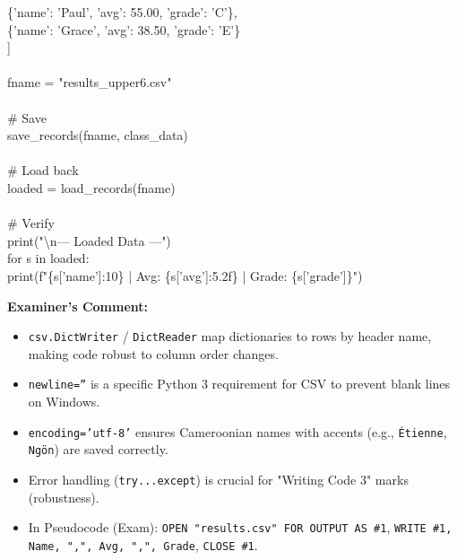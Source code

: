 \documentclass[11pt]{article}
\begin{document}
\begin{exoresolu}
\begin{flushleft}
\hspace{2em}\{'name': 'Paul', 'avg': 55.00, 'grade': 'C'\},\\
\hspace{2em}\{'name': 'Grace', 'avg': 38.50, 'grade': 'E'\}\\
\hspace{1em}]\\
\mbox{}\\
\hspace{1em}fname = "results\_upper6.csv"\\
\mbox{}\\
\hspace{1em}\# Save\\
\hspace{1em}save\_records(fname, class\_data)\\
\mbox{}\\
\hspace{1em}\# Load back\\
\hspace{1em}loaded = load\_records(fname)\\
\mbox{}\\
\hspace{1em}\# Verify\\
\hspace{1em}print("\textbackslash n--- Loaded Data ---")\\
\hspace{1em}for s in loaded:\\
\hspace{2em}print(f"\{s['name']:10\} | Avg: \{s['avg']:5.2f\} | Grade: \{s['grade']\}")
\end{flushleft}

\noindent\textbf{Examiner's Comment:}
\begin{itemize}
    \item \texttt{csv.DictWriter} / \texttt{DictReader} map dictionaries to rows by header name, making code robust to column order changes.
    \item \texttt{newline=''} is a specific Python 3 requirement for CSV to prevent blank lines on Windows.
    \item \texttt{encoding='utf-8'} ensures Cameroonian names with accents (e.g., \texttt{\'Etienne}, \texttt{Ng\"on}) are saved correctly.
    \item Error handling (\texttt{try...except}) is crucial for "Writing Code 3" marks (robustness).
    \item In Pseudocode (Exam): \texttt{OPEN "results.csv" FOR OUTPUT AS \#1}, \texttt{WRITE \#1, Name, ",", Avg, ",", Grade}, \texttt{CLOSE \#1}.
\end{itemize}
\end{exoresolu}
\end{document}
